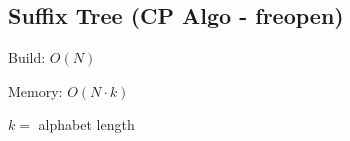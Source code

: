 \subsection{Suffix Tree (CP Algo - freopen)}

Build: $O(N)$

Memory: $O(N \cdot k)$

$k =$ alphabet length
